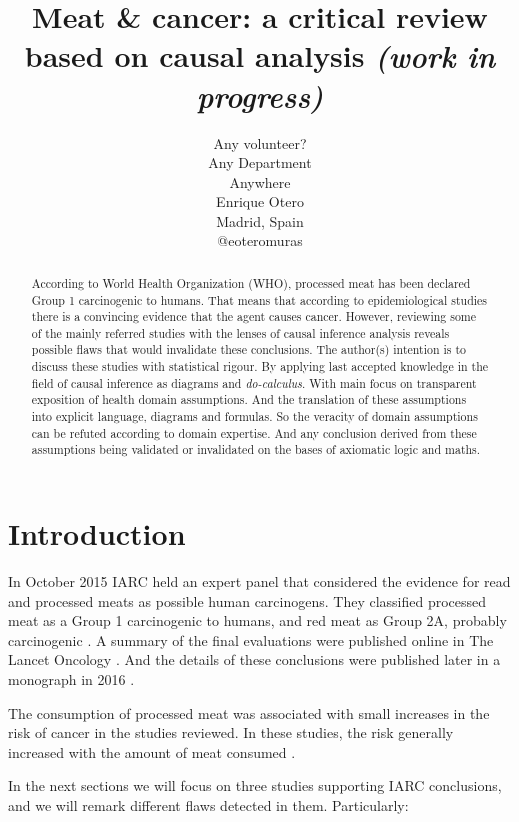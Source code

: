 \documentclass{article}
\title{Meat \& cancer: a critical review based on causal analysis \it{(work in progress)}}
\author{
  Any volunteer? \\
Any Department\\
  Anywhere\\
   \And
 Enrique Otero \\
  Madrid, Spain\\
  @eoteromuras \\
}
\begin{document}
\maketitle

\begin{abstract}
According to World Health Organization (WHO), processed meat has been declared Group 1 carcinogenic to humans. That means that according to epidemiological studies there is a convincing evidence that the agent causes cancer. However, reviewing some of the mainly referred studies with the lenses of causal inference analysis reveals possible flaws that would invalidate these conclusions. The author(s) intention is to discuss these studies with statistical rigour. By applying last accepted knowledge in the field of causal inference as diagrams and \textit{do-calculus}. With main focus on transparent exposition of health domain assumptions. And the translation of these assumptions into explicit language, diagrams and formulas. So the veracity of domain assumptions can be refuted according to domain expertise. And any conclusion derived from these assumptions being validated or invalidated on the bases of axiomatic logic and maths.

\end{abstract}




\section{Introduction}
 In October 2015 IARC held an expert panel that considered the evidence for read and processed meats as possible human carcinogens. They classified processed meat as a Group 1 carcinogenic to humans, and red meat as Group 2A, probably carcinogenic \cite{whoint}. A summary of the final evaluations were published online in The Lancet Oncology \cite{lancet}. And the details of these conclusions were published later in a monograph in 2016 \cite{monograph}.

The consumption of processed meat was associated with small increases in the risk of cancer in the studies reviewed. In these studies, the risk generally increased with the amount of meat consumed \cite{whoint}.


In the next sections we will focus on three studies supporting IARC conclusions, and we will remark different flaws detected in them. Particularly:
\end{document}
